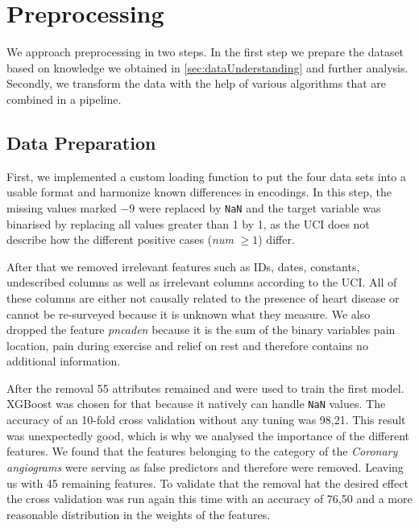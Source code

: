 




\section{Preprocessing} \label{sec:preprocessing}

We approach preprocessing in two steps. In the first step we prepare the dataset based on knowledge we obtained in \cref{sec:dataUnderstanding} and further analysis. 
Secondly, we transform the data with the help of various algorithms that are combined in a pipeline. 

\subsection{Data Preparation }
First, we implemented a custom loading function to put the four data sets into a usable format and harmonize known differences in encodings. In this step, the missing values marked $-9$ were replaced by \texttt{NaN} and the target variable was binarised by replacing all values greater than 1 by 1, as the UCI does not describe how the different positive cases (\textit{num} $\geq 1$) differ.

After that we removed irrelevant features such as IDs, dates, constants, undescribed columns as well as irrelevant columns according to the UCI. All of these columns are either not causally related to the presence of heart disease or cannot be re-surveyed because it is unknown what they measure. We also dropped the feature \textit{pncaden} because it is the sum of the binary variables  pain location, pain during exercise and relief on rest and therefore contains no additional information. 

After the removal 55 attributes remained and were used to train the first model. XGBoost was chosen for that because it natively can handle \texttt{NaN} values. The accuracy of an 10-fold cross validation without any tuning was 98,21. This result was unexpectedly good, which is why we analysed the importance of the different features. We found that the features belonging to the category of the \textit{Coronary angiograms} were serving as false predictors and therefore were removed. Leaving us with 45 remaining features. To validate that the removal hat the desired effect the cross validation was run again this time with an accuracy of 76,50 and a more reasonable distribution in the weights of the features.   

